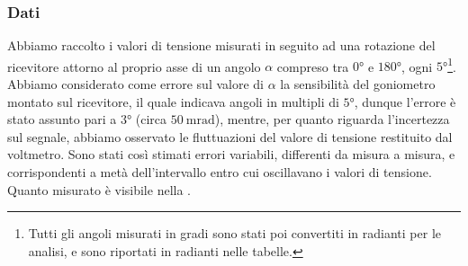 \documentclass[a4paper]{article}
\begin{document}
\subsubsection{Dati}
Abbiamo raccolto i valori di tensione misurati in seguito ad una rotazione del ricevitore attorno al proprio asse di un angolo $\alpha$ compreso tra $\ang{0}$ e $\ang{180}$, 
ogni $\ang{5}$\footnote{Tutti gli angoli misurati in gradi sono stati poi convertiti in radianti per le analisi, e sono riportati in radianti nelle tabelle.}.
Abbiamo considerato come errore sul valore di $\alpha$ la sensibilità del goniometro montato sul ricevitore, il quale indicava angoli in multipli di $\ang{5}$,
dunque l'errore è stato assunto pari a $\ang{3}$ (circa $\SI{50}{\milli\radian}$), mentre, per quanto riguarda l'incertezza sul segnale, abbiamo osservato le fluttuazioni del valore di tensione restituito dal voltmetro.
Sono stati così stimati errori variabili, differenti da misura a misura, e corrispondenti a metà dell'intervallo entro cui oscillavano i valori di tensione.
Quanto misurato è visibile nella .
\end{document}
